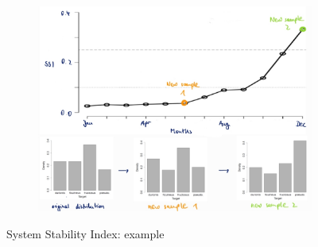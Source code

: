 \begin{figure}[H]
  \centering
  \begin{subfigure}{0.8\textwidth}
    \centering
    \includegraphics[width=\textwidth]{assets/sl/cd__ssi.jpg}
  \end{subfigure}

  \caption{System Stability Index: example}
  \label{fig:7_cd_ssi}
\end{figure}

